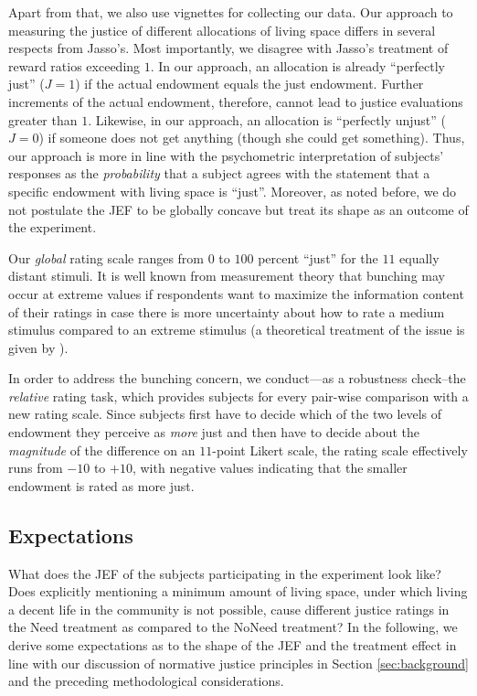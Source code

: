 \documentclass[12pt]{scrartcl}
\begin{document}
Apart from that, we also use vignettes for collecting our data.
Our approach to measuring the justice of different allocations of living space differs in several respects from Jasso's.
Most importantly, we disagree with Jasso's treatment of reward ratios exceeding $1$.
In our approach, an allocation is already ``perfectly just'' ($J=1$) if the actual endowment equals the just endowment.
Further increments of the actual endowment, therefore, cannot lead to justice evaluations greater than $1$.
Likewise, in our approach, an allocation is ``perfectly unjust'' ($J=0$) if someone does not get anything (though she could get something).
Thus, our approach is more in line with the psychometric interpretation of subjects' responses as the \textit{probability} that a subject agrees with the statement that a specific endowment with living space is ``just''.
Moreover, as noted before, we do not postulate the JEF to be globally concave but treat its shape as an outcome of the experiment.

Our \textit{global} rating scale ranges from $0$ to $100$ percent ``just'' for the $11$ equally distant stimuli.
It is well known from measurement theory that bunching may occur at extreme values \citep[e.\,g.,][]{mickes_strong_2011} if respondents want to maximize the information content of their ratings in case there is more uncertainty about how to rate a medium stimulus compared to an extreme stimulus (a theoretical treatment of the issue is given by \citealt[p.~1652ff.]{seidl_how_1994}).

In order to address the bunching concern, we conduct---as a robustness check--the \textit{relative} rating task, which provides subjects for every pair-wise comparison with a new rating scale.
Since subjects first have to decide which of the two levels of endowment they perceive as \textit{more} just and then have to decide about the \textit{magnitude} of the difference on an $11$-point Likert scale, the rating scale effectively runs from $-10$ to $+10$, with negative values indicating that the smaller endowment is rated as more just.


\subsection{Expectations}\label{sec:expectations}
What does the JEF of the subjects participating in the experiment look like?
Does explicitly mentioning a minimum amount of living space, under which living a decent life in the community is not possible, cause different justice ratings in the Need treatment as compared to the NoNeed treatment?
In the following, we derive some expectations as to the shape of the JEF and the treatment effect in line with our discussion of normative justice principles in Section \ref{sec:background} and the preceding methodological considerations.
\end{document}
